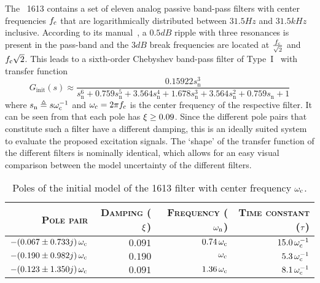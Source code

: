     The \BK~1613 contains a set of eleven analog passive band-pass filters with center frequencies $f_{\mathrm{c}}$ that are logarithmically distributed between $31.5\unit{Hz}$ and $31.5\unit{kHz}$ inclusive.
    According to its manual~\citep{datasheet_bk1613}, a $0.5\unit{dB}$ ripple with three resonances is present in the pass-band and the $3\unit{dB}$ break frequencies are located at $\frac{f_{\mathrm{c}}}{\sqrt{2}}$ and $f_{\mathrm{c}} \sqrt{2}$.
    This leads to a sixth-order Chebyshev band-pass filter of Type~I~\citep{Zverev1967} with transfer function
    \begin{equation}
       G_{\mathrm{init}}(s) \approx 
      \frac{0.15922 s_{\mathrm{n}}^3 }
                {              s_{\mathrm{n}}^6 
                + 0.759 s_{\mathrm{n}}^5 
                + 3.564 s_{\mathrm{n}}^4 
                + 1.678 s_{\mathrm{n}}^3 
                + 3.564 s_{\mathrm{n}}^2 
                + 0.759 s_{\mathrm{n}} 
                + 1}
      \label{eq:excitation:bk1613:tf-init}
     \end{equation}
     where $s_{\mathrm{n}} \triangleq s \omega_{\mathrm{c}}^{-1}$ and $\omega_{\mathrm{c}}=2\pi f_{\mathrm{c}}$ is the center frequency of the respective filter.
     It can be seen from  that each pole has $\xi_{} \geq 0.09$.
    Since the different pole pairs that constitute such a filter have a different damping, this is an ideally suited system to evaluate the proposed excitation signals.
    The `shape' of the transfer function of the different filters is nominally identical, which allows for an easy visual comparison between the model uncertainty of the different filters.

    \begin{table}[bt]
      \centering
      \caption{Poles of the initial model of the \bruelkjaer{} 1613 filter with center frequency $\omega_{\mathrm{c}}$.}
      \label{tbl:excitation:bk1613:poles}
      \begin{tabular}{rrrr}
        \toprule
        \textsc{Pole pair} & \textsc{Damping ($\xi_{}$)} & \textsc{Frequency ($\omega_{\mathrm{n}}$)} & \textsc{Time constant ($\tau_{}$)}\\
        \midrule
        $-(0.067 \pm 0.733j)\,\omega_{\mathrm{c}}$ & $0.091$ & $0.74\,\omega_{\mathrm{c}}$ & $15.0\,\omega_{\mathrm{c}}^{-1}$\\ 
        $-(0.190 \pm 0.982j)\,\omega_{\mathrm{c}}$ & $0.190$ & $\omega_{\mathrm{c}}$ & $5.3\, \omega_{\mathrm{c}}^{-1}$\\ 
        $-(0.123 \pm 1.350j)\,\omega_{\mathrm{c}}$ & $0.091$ & $1.36\,\omega_{\mathrm{c}}$ & $8.1 \,\omega_{\mathrm{c}}^{-1}$\\ 
        \bottomrule
      \end{tabular}
    \end{table}

